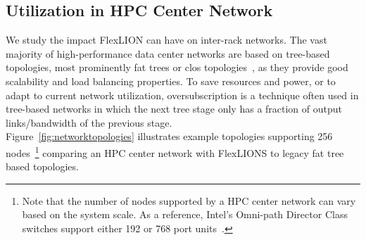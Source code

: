 \subsection{Utilization in HPC Center Network}
We study the impact FlexLION can have on inter-rack networks. The vast majority of high-performance data center networks are based on tree-based topologies, most prominently fat trees or clos topologies~\cite{kachris2012survey}, as they provide good scalability and load balancing properties. To save resources and power, or to adapt to current network utilization, oversubscription is a technique often used in tree-based networks in which the next tree stage only has a fraction of output links/bandwidth of the previous stage. \\
Figure~\ref{fig:networktopologies} illustrates example topologies supporting 256 nodes~\footnote{Note that the number of nodes supported by a HPC center network can vary based on the system scale. As a reference, Intel's Omni-path Director Class switches support either 192 or 768 port units~\cite{inteldir}.} comparing an HPC center network with FlexLIONS to legacy fat tree based topologies. 
